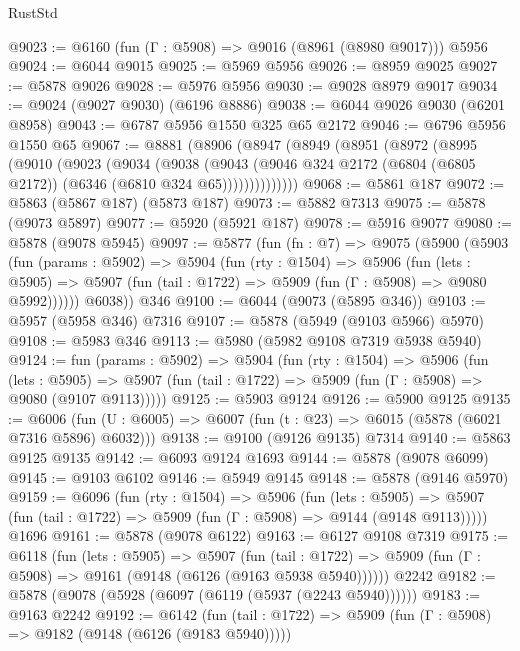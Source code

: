 \begin{lexlean}{RustStd}
\begin{coremodule}
@9023 := @6160 (fun (Γ : @5908) => @9016 (@8961 (@8980 @9017))) @5956
@9024 := @6044 @9015
@9025 := @5969 @5956
@9026 := @8959 @9025
@9027 := @5878 @9026
@9028 := @5976 @5956
@9030 := @9028 @8979 @9017
@9034 := @9024 (@9027 @9030) (@6196 @8886)
@9038 := @6044 @9026 @9030 (@6201 @8958)
@9043 := @6787 @5956 @1550 @325 @65 @2172
@9046 := @6796 @5956 @1550 @65
@9067 := @8881
    (@8906
      (@8947
        (@8949
          (@8951
            (@8972
              (@8995
                (@9010
                  (@9023
                    (@9034
                      (@9038
                        (@9043
                          (@9046
                            @324
                            @2172
                            (@6804 (@6805 @2172))
                            (@6346 (@6810 @324 @65))))))))))))))
@9068 := @5861 @187
@9072 := @5863 (@5867 @187) (@5873 @187)
@9073 := @5882 @7313
@9075 := @5878 (@9073 @5897)
@9077 := @5920 (@5921 @187)
@9078 := @5916 @9077
@9080 := @5878 (@9078 @5945)
@9097 := @5877
    (fun (fn : @7) =>
    @9075
      (@5900
        (@5903
          (fun (params : @5902) =>
          @5904
            (fun (rty : @1504) =>
            @5906
              (fun (lets : @5905) =>
              @5907 (fun (tail : @1722) => @5909 (fun (Γ : @5908) => @9080 @5992))))))
        @6038))
    @346
@9100 := @6044 (@9073 (@5895 @346))
@9103 := @5957 (@5958 @346) @7316
@9107 := @5878 (@5949 (@9103 @5966) @5970)
@9108 := @5983 @346
@9113 := @5980 (@5982 @9108 @7319 @5938 @5940)
@9124 := fun (params : @5902) =>
  @5904
    (fun (rty : @1504) =>
    @5906
      (fun (lets : @5905) =>
      @5907 (fun (tail : @1722) => @5909 (fun (Γ : @5908) => @9080 (@9107 @9113)))))
@9125 := @5903 @9124
@9126 := @5900 @9125
@9135 := @6006 (fun (U : @6005) => @6007 (fun (t : @23) => @6015 (@5878 (@6021 @7316 @5896) @6032)))
@9138 := @9100 (@9126 @9135) @7314
@9140 := @5863 @9125 @9135
@9142 := @6093 @9124 @1693
@9144 := @5878 (@9078 @6099)
@9145 := @9103 @6102
@9146 := @5949 @9145
@9148 := @5878 (@9146 @5970)
@9159 := @6096
    (fun (rty : @1504) =>
    @5906
      (fun (lets : @5905) =>
      @5907 (fun (tail : @1722) => @5909 (fun (Γ : @5908) => @9144 (@9148 @9113)))))
    @1696
@9161 := @5878 (@9078 @6122)
@9163 := @6127 @9108 @7319
@9175 := @6118
    (fun (lets : @5905) =>
    @5907
      (fun (tail : @1722) => @5909 (fun (Γ : @5908) => @9161 (@9148 (@6126 (@9163 @5938 @5940))))))
    @2242
@9182 := @5878 (@9078 (@5928 (@6097 (@6119 (@5937 (@2243 @5940))))))
@9183 := @9163 @2242
@9192 := @6142
    (fun (tail : @1722) => @5909 (fun (Γ : @5908) => @9182 (@9148 (@6126 (@9183 @5940)))))

\end{coremodule}
\end{lexlean}
